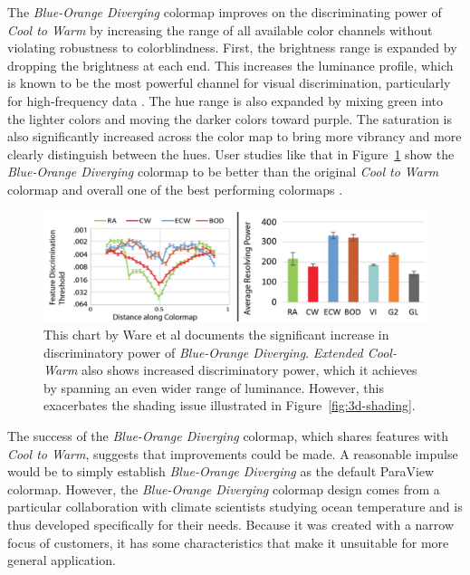 \documentclass{IEEEcsmag}
\newcommand*{\colormap}[1]{\textsl{#1}\xspace}
\newcommand*{\coolwarm}{\colormap{Cool to Warm}}
\newcommand*{\blueorange}{\colormap{Blue-Orange Diverging}}
\newcommand*{\fast}{\colormap{Fast}}
\begin{document}
The \blueorange colormap improves on the discriminating power of \coolwarm by increasing the range of all available color channels without violating robustness to colorblindness.
First, the brightness range is expanded by dropping the brightness at each end.
This increases the luminance profile, which is known to be the most powerful channel for visual discrimination, particularly for high-frequency data \cite{Ware2019}.
The hue range is also expanded by mixing green into the lighter colors and moving the darker colors toward purple.
The saturation is also significantly increased across the color map to bring more vibrancy and more clearly distinguish between the hues.
User studies like that in Figure~\ref{Ware}
show the \blueorange colormap to be better than the original \coolwarm colormap and overall one of the best performing colormaps \cite{Ware2017,Ware2019,Turton2017}.

\begin{figure}
\includegraphics[width=\linewidth]{pics/Ware17.png}
\caption{This chart by Ware et al \cite{Ware2019} documents the significant increase in discriminatory power of \blueorange. \colormap{Extended Cool-Warm} also shows increased discriminatory power, which it achieves by spanning an even wider range of luminance. However, this exacerbates the shading issue illustrated in Figure~\ref{fig:3d-shading}.}
\label{Ware}
\end{figure}

The success of the \blueorange colormap, which shares features with \coolwarm, suggests that improvements could be made.
A reasonable impulse would be to simply establish \blueorange as the default ParaView colormap.
However, the \blueorange colormap design comes from a particular collaboration with climate scientists studying ocean temperature and is thus developed specifically for their needs.
Because it was created with a narrow focus of customers, it has some characteristics that make it unsuitable for more general application.

\end{document}
